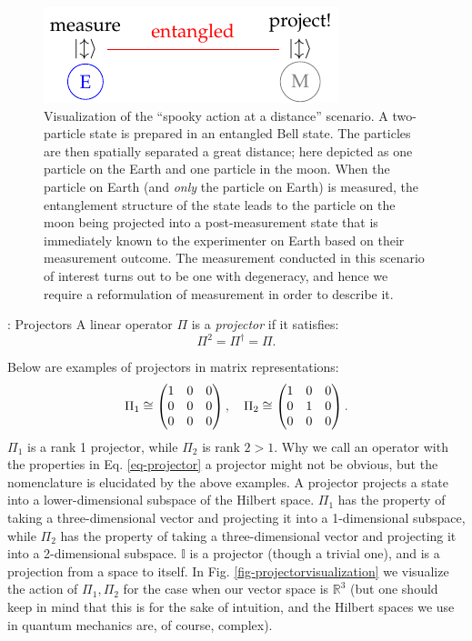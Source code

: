 \begin{figure}[htbp]
    \centering
    \includegraphics[]{Images/fig-spookyaction.pdf}
    \caption{Visualization of the ``spooky action at a distance'' scenario. A two-particle state is prepared in an entangled Bell state. The particles are then spatially separated a great distance; here depicted as one particle on the Earth and one particle in the moon. When the particle on Earth (and \emph{only} the particle on Earth) is measured, the entanglement structure of the state leads to the particle on the moon being projected into a post-measurement state that is immediately known to the experimenter on Earth based on their measurement outcome. The measurement conducted in this scenario of interest turns out to be one with degeneracy, and hence we require a reformulation of measurement in order to describe it.}
    \label{fig-spookyaction}
\end{figure}

\begin{defbox}{: Projectors}
    A linear operator $\Pi$ is a \emph{projector} if it satisfies:
    \begin{equation}\label{eq-projector}
        \Pi^2 = \Pi^\dagger = \Pi.
    \end{equation}
\end{defbox}
Below are examples of projectors in matrix representations:
\begin{equation}\label{eq-projectorexamples}
    \Pi_1 \cong \begin{pmatrix} 1 & 0 & 0 \\ 0 & 0 & 0 \\ 0 & 0 & 0 \end{pmatrix}, \quad \Pi_2 \cong \begin{pmatrix} 1 & 0 & 0 \\ 0 & 1 & 0 \\ 0 & 0 & 0 \end{pmatrix}.
\end{equation}
$\Pi_1$ is a rank 1 projector, while $\Pi_2$ is rank $2 > 1$. Why we call an operator with the properties in Eq. \eqref{eq-projector} a projector might not be obvious, but the nomenclature is elucidated by the above examples. A projector projects a state into a lower-dimensional subspace of the Hilbert space. $\Pi_1$ has the property of taking a three-dimensional vector and projecting it into a 1-dimensional subspace, while  $\Pi_2$ has the property of taking a three-dimensional vector and projecting it into a 2-dimensional subspace. $\mathbb{I}$ is a projector (though a trivial one), and is a projection from a space to itself. In Fig. \ref{fig-projectorvisualization} we visualize the action of $\Pi_1, \Pi_2$ for the case when our vector space is $\mathbb{R}^3$ (but one should keep in mind that this is for the sake of intuition, and the Hilbert spaces we use in quantum mechanics are, of course, complex).

